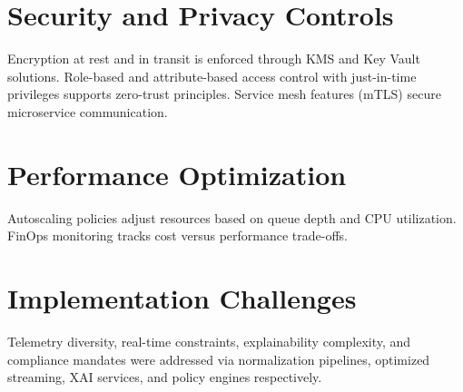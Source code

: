 \section{Security and Privacy Controls}
Encryption at rest and in transit is enforced through KMS and Key Vault solutions. Role-based and attribute-based access control with just-in-time privileges supports zero-trust principles. Service mesh features (mTLS) secure microservice communication.

\section{Performance Optimization}
Autoscaling policies adjust resources based on queue depth and CPU utilization. FinOps monitoring tracks cost versus performance trade-offs.

\section{Implementation Challenges}
Telemetry diversity, real-time constraints, explainability complexity, and compliance mandates were addressed via normalization pipelines, optimized streaming, XAI services, and policy engines respectively.
